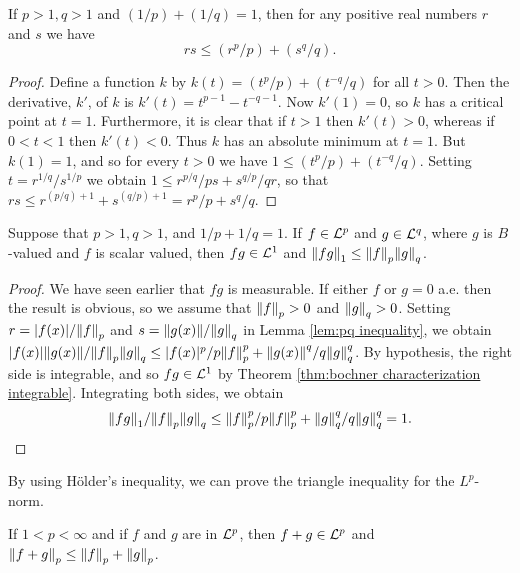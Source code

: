\begin{lemma}\label{lem:pq inequality}
If $p>1,q>1$ and $(1/p)+(1/q)=1$, then for any positive real numbers $r$ and $s$ we have \[rs\leq(r^p/p)+(s^q/q).\]
\end{lemma}

\begin{proof}
Define a function $k$ by $k(t)=(t^p/p)+(t^{-q}/q)$ for all $t>0$. Then the derivative, $k'$, of $k$ is $k'(t)=t^{p-1}-t^{-q-1}$. Now $k'(1)=0$, so $k$ has a critical point at $t=1$. Furthermore, it is clear that if $t>1$ then $k'(t)>0$, whereas if $0<t<1$ then $k'(t)<0$. Thus $k$ has an absolute minimum at $t=1$. But $k(1)=1$, and so for every $t>0$ we have $1\leq(t^p/p)+(t^{-q}/q)$. Setting $t=r^{1/q}/s^{1/p}$ we obtain $1\leq r^{p/q}/ps+s^{q/p}/qr$, so that $rs\leq r^{(p/q)+1}+s^{(q/p)+1}=r^p/p+s^q/q$.
\end{proof}

\begin{theorem}\label{thm:holders}
Suppose that $p>1, q>1$, and $1/p+1/q=1$. If $f\in{\cal L}^p$ and $g\in{\cal L}^q$, where $g$ is $B$-valued and $f$ is scalar valued, then $fg\in{\cal L}^1$ and $\norm{fg}_1\leq\norm{f}_p\norm{g}_q$.
\end{theorem}

\begin{proof}
We have seen earlier that $fg$ is measurable. If either $f$ or $g=0$ a.e. then the result is obvious, so we assume that $\norm{f}_p>0$ and $\norm{g}_q>0$. Setting $r=|f(x)|/\norm{f}_p$ and $s=\norm{g(x)}/\norm{g}_q$ in Lemma \ref{lem:pq inequality}, we obtain $|f(x)|\norm{g(x)}/\norm{f}_p\norm{g}_q\leq|f(x)|^p/p\norm{f}_p^p+\norm{g(x)}^q/q\norm{g}_q^q$. By hypothesis, the right side is integrable, and so $f g\in {\cal L}^1$ by Theorem \ref{thm:bochner characterization integrable}. Integrating both sides, we obtain \[\norm{fg}_1/\norm{f}_p\norm{g}_q\leq\norm{f}_p^p/p\norm{f}_p^p+\norm{g}_q^q/q\norm{g}_q^q=1.\]
\end{proof}

By using H\"older's inequality, we can prove the triangle inequality for the $L^p$-norm.

\begin{theorem}\label{thm:minkowski inequality}
If $1<p<\infty$ and if $f$ and $g$ are in ${\cal L}^p$, then $f+g\in{\cal L}^p$ and $\norm{f+g}_p\leq\norm{f}_p+\norm{g}_p$.
\end{theorem}

